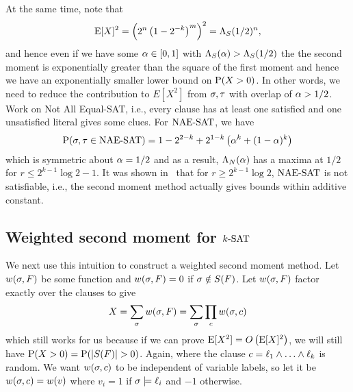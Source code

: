 \documentclass[letterpaper, 10pt, twocolumn, reqno]{amsart}
\begin{document}
At the same time, note that
$$
\E[X]^2 = \rbrac{2^n \rbrac{1 - 2^{-k}}^m }^2 = \L_S(1/2)^n,
$$
and hence even if we have some $\a \in [0,1]$ with $\L_S(\a) > \L_S(1/2)$ the
the second moment is exponentially greater than the square of the first moment and hence we have an exponentially smaller lower bound on $\P(X > 0)$. In
other words, we need to reduce the contribution to $E[X^2]$ from $\s,\t$ with overlap of $\a > 1/2$. Work on Not All Equal-SAT, i.e., every clause has at
least one satisfied and one unsatisfied literal gives some clues. For $\NAESAT$, we have
$$
\P(\s,\t \in \NAESAT) = 1 - 2^{2-k} + 2^{1-k} \rbrac{\a^k + (1-\a)^k}
$$
which is symmetric about $\a = 1/2$ and as a result, $\L_N(\a)$ has a maxima at $1/2$ for $r \leq 2^{k-1} \log2 -1$. It was shown in~\cite{achlioptas2002asymptotic} that for $r \geq 2^{k-1} \log2$, $\NAESAT$ is not satisfiable, i.e., the second moment method actually gives bounds within additive constant.

\subsection{Weighted second moment for $\ksat$}
\label{ssec:ksat_weighted}
We next use this intuition to construct a weighted second moment method. Let $\wsf$ be some function and $\wsf = 0$ if $\s \notin \sf$. Let $\wsf$ factor exactly over the clauses to give
$$X = \sum_\s \wsf = \sum_\s \prod_c \wsc$$
which still works for us because if we can prove $\E[X^2] = \bigo\rbrac{\E[X]^2}$, we will still have $\P(X > 0) = \P(\abs{\sf} > 0)$. Again,
where the clause $c = \ell_1 \aand \ldots \aand \ell_k$ is random. We want $\wsc$ to be independent of variable labels, so let it be $\wsc = \wv$ where $v_i =1$ if $\s \sat \ell_i$ and $-1$ otherwise.
\end{document}
